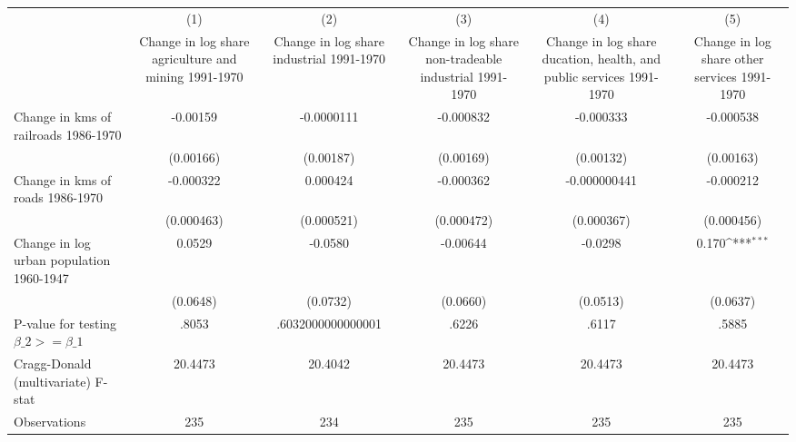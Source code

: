 {
\def\sym#1{\ifmmode^{#1}\else\(^{#1}\)\fi}
\begin{tabular}{l*{5}{c}}
\hline\hline
                &\multicolumn{1}{c}{(1)}&\multicolumn{1}{c}{(2)}&\multicolumn{1}{c}{(3)}&\multicolumn{1}{c}{(4)}&\multicolumn{1}{c}{(5)}\\
                &\multicolumn{1}{c}{Change in log share agriculture and mining 1991-1970}&\multicolumn{1}{c}{Change in log share industrial 1991-1970}&\multicolumn{1}{c}{Change in log share non-tradeable industrial 1991-1970}&\multicolumn{1}{c}{Change in log share ducation, health, and public services 1991-1970}&\multicolumn{1}{c}{Change in log share other services 1991-1970}\\
\hline
Change in kms of railroads 1986-1970& -0.00159         &-0.0000111         &-0.000832         &-0.000333         &-0.000538         \\
                &(0.00166)         &(0.00187)         &(0.00169)         &(0.00132)         &(0.00163)         \\
[1em]
Change in kms of roads 1986-1970&-0.000322         & 0.000424         &-0.000362         &-0.000000441         &-0.000212         \\
                &(0.000463)         &(0.000521)         &(0.000472)         &(0.000367)         &(0.000456)         \\
[1em]
Change in log urban population 1960-1947&   0.0529         &  -0.0580         & -0.00644         &  -0.0298         &    0.170\sym{***}\\
                & (0.0648)         & (0.0732)         & (0.0660)         & (0.0513)         & (0.0637)         \\
\hline
P-value for testing $\beta\_{2} >= \beta\_{1}$&    .8053         &.6032000000000001         &    .6226         &    .6117         &    .5885         \\
Cragg-Donald (multivariate) F-stat&  20.4473         &  20.4042         &  20.4473         &  20.4473         &  20.4473         \\
Observations    &      235         &      234         &      235         &      235         &      235         \\
\hline\hline
\end{tabular}
}
